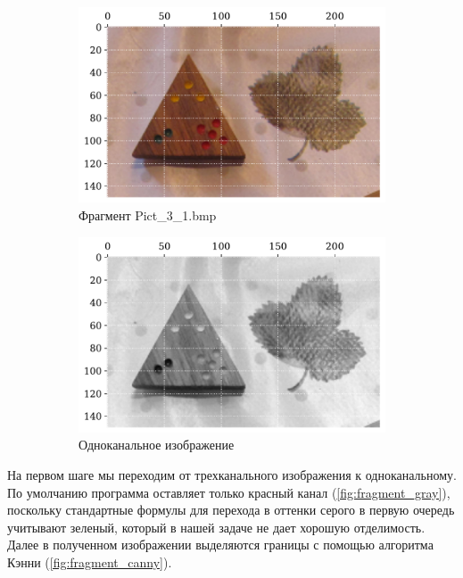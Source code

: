 \documentclass[12pt]{article}
\begin{document}
\begin{figure}[!h]
    \begin{subfigure}{.45\linewidth}
        \includegraphics[width=.93\linewidth]{fragment_input.pdf}
        \centering
        \caption{Фрагмент Pict\_3\_1.bmp}
        \label{fig:fragment_input}
    \end{subfigure}
    \begin{subfigure}{.45\linewidth}
        \includegraphics[width=.93\linewidth]{fragment_gray.pdf}
        \centering
        \caption{Одноканальное изображение}
        \label{fig:fragment_gray}
    \end{subfigure}
    \centering
    \caption{}
\end{figure}

На первом шаге мы переходим от трехканального изображения к одноканальному. По умолчанию программа оставляет только красный канал (\autoref{fig:fragment_gray}), поскольку стандартные формулы для перехода в оттенки серого в первую очередь учитывают зеленый, который в нашей задаче не дает хорошую отделимость. Далее в полученном изображении выделяются границы с помощью алгоритма Кэнни (\autoref{fig:fragment_canny}).
\end{document}
